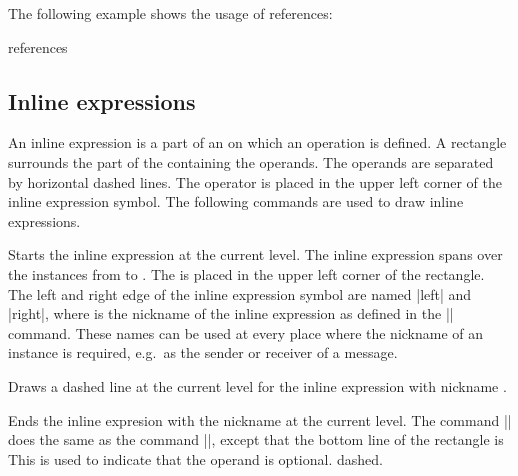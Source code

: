 \documentclass[12pt,a4paper]{article}
\begin{document}
The following example shows the usage of references:

\begin{codeexample}[width=\linewidth-9.6cm]
\begin{msc}{references}
\nextlevel
{}
\nextlevel
{}
\nextlevel[2]
\nextlevel[2]
\nextlevel
{}
\nextlevel[4]
\end{msc}
\end{codeexample}

\subsection{Inline expressions}
\label{inlines}
An inline expression is a part of an \MSC{} on which an operation is
defined. A rectangle surrounds the part of the \MSC{} containing the
operands. The operands are separated by horizontal dashed lines.
The operator is placed in the upper left corner of the inline
expression symbol.
The following commands are used to draw inline expressions.

\begin{command}{\inlinestart{}}
  Starts the inline expression at the current level. The inline expression
  spans over the instances from  to .
  The  is placed in the upper left corner of the rectangle.
% 
  The left and right edge of the inline expression symbol are named
  |left| and |right|, where  is
  the nickname of the inline expression as defined in the
  |\inlinestart| command.
  These names can be used at every place where the nickname of an
  instance is required, e.g.\ as the sender or receiver of a message.
\end{command}
\begin{command}{\inlineseparator{}}
  Draws a dashed line at the current level for the inline expression with
  nickname .
\end{command}
\begin{command}{\inlineend\opt{*}}
  Ends the inline expresion with the nickname  at the current level.
  The command |\inlineend*| does the same as the command
  |\inlineend|, except that the bottom line of the rectangle is
  This is used to indicate that the operand is optional.
  dashed.
\end{command}
\end{document}
